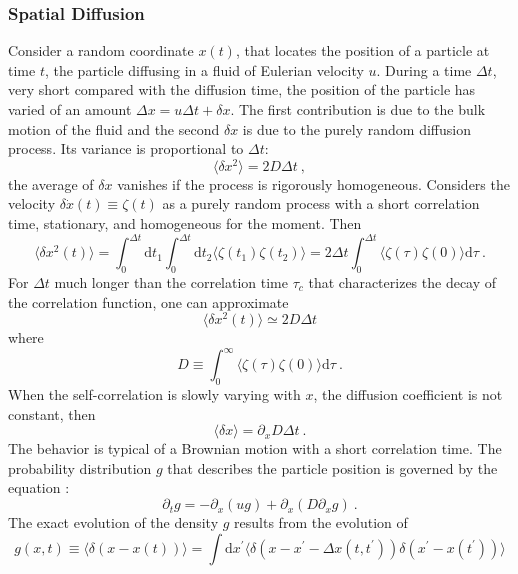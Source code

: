 \documentclass[12pt,a4paper]{article}
\newcommand{\dif}{\mathrm{d}}
\begin{document}
\subsubsection{Spatial Diffusion}
Consider a random coordinate $x(t)$, that locates the position of a particle at time $t$, the particle diffusing in a fluid of Eulerian velocity $u$. During a time $\Delta t$, very short compared with the diffusion time, the position of the particle has varied of an amount $\Delta x = u \Delta t +\delta x$. The first contribution is due to the bulk motion of the fluid and the second $\delta x$ is due to the purely random diffusion process. Its variance is proportional to $\Delta t$:
\begin{equation}
\langle \delta x^2 \rangle = 2D \Delta t ~,
\end{equation}
the average of $\delta x$ vanishes if the process is rigorously homogeneous. Considers the velocity $\delta \dot{x}(t)  \equiv \zeta(t)$ as a purely random process with a short correlation time, stationary, and homogeneous for the moment. Then
\begin{equation}
\langle \delta x^2(t) \rangle = \int_0^{\Delta t} \dif t_1 \int_0^{\Delta t} \dif t_2 \langle \zeta(t_1) \zeta(t_2) \rangle = 2 \Delta t \int_0^{\Delta t} \langle \zeta(\tau) \zeta(0) \rangle \dif \tau ~.
\end{equation}
For $\Delta t$ much longer than the correlation time $\tau_c$ that characterizes the decay of the correlation function,  one can approximate
\begin{equation}
\langle \delta x^2(t) \rangle \simeq 2 D \Delta t
\end{equation}
where
\begin{equation}
D \equiv \int_0^{\infty} \langle \zeta(\tau) \zeta(0) \rangle \dif \tau ~.
\end{equation}
When the self-correlation is slowly varying with $x$, the diffusion coefficient is not constant, then 
\begin{equation}
\langle \delta x \rangle = \partial_x D \Delta t ~.
\end{equation}
The behavior is typical of a Brownian motion with a short correlation time. The probability distribution $g$ that describes the particle position is governed by the equation :
\begin{equation}
\partial_t g = -\partial_x (ug) +\partial_x (D\partial_x g) ~.
\end{equation}
The exact evolution of the density $g$ results from the evolution of
\begin{equation}
g(x, t) \equiv \langle \delta (x-x(t)) \rangle = \int \dif x^\prime \langle \delta (x-x^\prime -\Delta x(t, t^\prime)) \delta (x^\prime-x(t^\prime)) \rangle
\end{equation}
\end{document}

